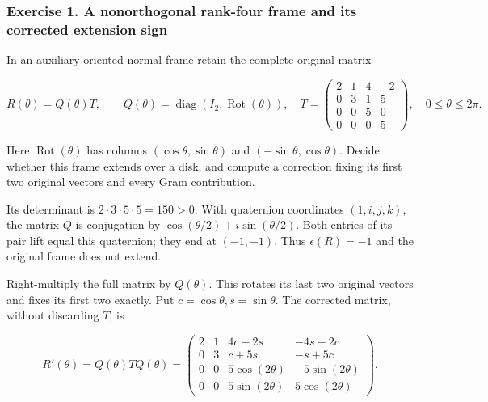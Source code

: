 \subsubsection{Exercise 1. A nonorthogonal rank-four frame and its corrected extension sign}
\label{courseIII:whitney-moves-in-the-receiving-dimensions:exercise-1}

\label{courseIII:whitney-receiving:5.1}

In an auxiliary oriented normal frame retain the complete original matrix

\begin{equation}
R(\theta)=Q(\theta)T,\qquad
 Q(\theta)=\operatorname{diag}(I_2,\operatorname{Rot}(\theta)),
 \quad
 T=\begin{pmatrix}
 2&1&4&-2\\0&3&1&5\\0&0&5&0\\0&0&0&5
 \end{pmatrix},
 \quad0\leq\theta\leq2\pi .
 \label{courseIII:whitney-moves-in-the-receiving-dimensions:eq:5.1}
\end{equation}

Here \(\operatorname{Rot}(\theta)\) has columns \((\cos\theta,\sin\theta)\) and \((-\sin\theta,\cos\theta)\). Decide whether this frame extends over a disk, and compute a correction fixing its first two original vectors and every Gram contribution.

Its determinant is \(2\cdot3\cdot5\cdot5=150>0\). With quaternion coordinates \((1,i,j,k)\), the matrix \(Q\) is conjugation by \(\cos(\theta/2)+i\sin(\theta/2)\). Both entries of its pair lift equal this quaternion; they end at \((-1,-1)\). Thus \(\epsilon(R)=-1\) and the original frame does not extend.

Right-multiply the full matrix by \(Q(\theta)\). This rotates its last two original vectors and fixes its first two exactly. Put \(c=\cos\theta,s=\sin\theta\). The corrected matrix, without discarding \(T\), is

\begin{equation}
R'(\theta)=Q(\theta)TQ(\theta)=
 \begin{pmatrix}
 2&1&4c-2s&-4s-2c\\
 0&3&c+5s&-s+5c\\
 0&0&5\cos(2\theta)&-5\sin(2\theta)\\
 0&0&5\sin(2\theta)&5\cos(2\theta)
 \end{pmatrix}.
 \label{courseIII:whitney-moves-in-the-receiving-dimensions:eq:5.2}
\end{equation}

